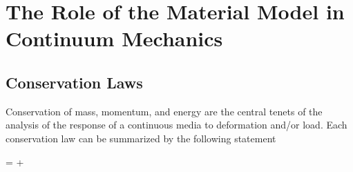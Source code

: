 \documentclass[12pt,report,strict]{SANDreport/SANDreport}
\begin{document}
\section{The Role of the Material Model in Continuum Mechanics}
\label{sec:roleofmatmod}

\subsection{Conservation Laws}
\label{sec:cons-laws}
Conservation of mass, momentum, and energy are the central tenets of the
analysis of the response of a continuous media to deformation and/or load.
Each conservation law can be summarized by the following statement

\begin{minipage}{\textwidth}
\begin{center}
   =
   +
\end{center}
\end{minipage}
\end{document}
